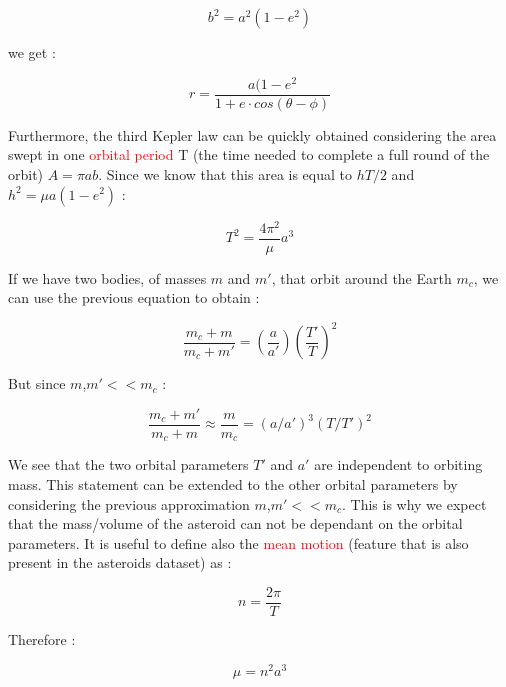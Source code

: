 \documentclass[12pt,%
               a4paper,%
               oneside,openany,%
               titlepage,%
               headinclude,footinclude,%
               BCOR5mm,%
               cleardoublepage=empty,%
               tablecaptionabove,%
               floatperchapter,
               ]{scrreprt}                 %
\begin{document}
\begin{equation}
b^{2}=a^{2}(1-e^{2})
\end{equation}

we get \cite{murray1999solar}:

\begin{equation}
r=\frac{a(1-e^{2}}{1+e\cdot cos(\theta-\phi)}
\label{eq-mot}
\end{equation}

Furthermore, the third Kepler law can be quickly obtained considering the area swept in one \textcolor{red}{orbital period} T (the time needed to complete a full round of the orbit) $A=\pi ab$. Since we know that this area is equal to $hT/2$ and $h^{2}=\mu a(1-e^{2})$ \cite{murray1999solar}:

\begin{equation}
T^{2}=\dfrac{4\pi^{2}}{\mu}a^{3}
\end{equation}

If we have two bodies, of masses $m$ and $m'$, that orbit around the Earth $m_{c}$, we can use the previous equation to obtain \cite{murray1999solar}:

\begin{equation}
\frac{m_{c}+m}{m_{c}+m'}=\left(\frac{a}{a'}\right)\left(\frac{T'}{T}\right)^{2}
\end{equation}

But since $m$,$m'<<m_{c}$ \cite{murray1999solar}:

\begin{equation}
\frac{m_{c}+m'}{m_{c}+m}\approx\dfrac{m}{m_{c}}=\left(a/a'\right)^{3}\left( T/T'\right)^{2}
\end{equation}

We see that the two orbital parameters $T'$ and $a'$ are independent to orbiting mass. This statement can be extended to the other orbital parameters by considering the previous approximation $m$,$m'<<m_{c}$. This is why we expect that the mass/volume of the asteroid can not be  dependant on the orbital parameters. It is useful to define also the \textcolor{red}{mean motion} (feature that is also present in the asteroids dataset) as \cite{murray1999solar}:

\begin{equation}
n=\frac{2\pi}{T}
\end{equation}

Therefore \cite{murray1999solar}:

\begin{equation}
\mu=n^{2}a^{3}
\end{equation}
\end{document}
